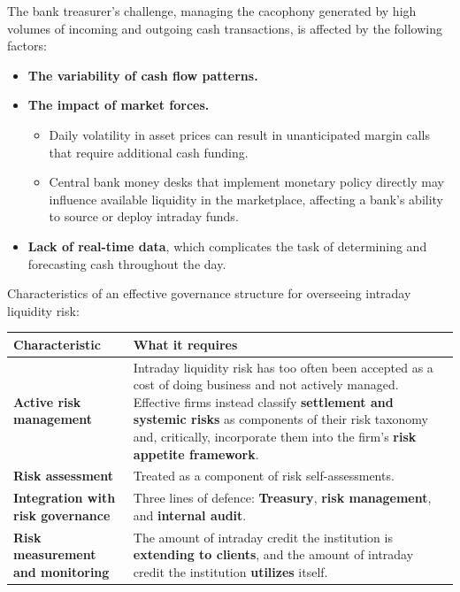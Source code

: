 The bank treasurer's challenge, managing the cacophony generated by high volumes of incoming and outgoing cash transactions, is affected by the following factors:

\begin{itemize}
\item \textbf{The variability of cash flow patterns.}
\item \textbf{The impact of market forces.}
  \begin{itemize}
  \item Daily volatility in asset prices can result in unanticipated margin calls that require additional cash funding.
  \item Central bank money desks that implement monetary policy directly may influence available liquidity in the marketplace, affecting a bank's ability to source or deploy intraday funds.
  \end{itemize}
\item \textbf{Lack of real-time data}, which complicates the task of determining and forecasting cash throughout the day.
\end{itemize}


Characteristics of an effective governance structure for overseeing intraday liquidity risk:

\begin{center}
\small
\begin{tabularx}{\textwidth}{@{}p{4.1cm} X@{}}
\toprule
\rowcolor{FRMSoft}\textbf{Characteristic} & \textbf{What it requires} \\
\midrule
\textbf{Active risk management} &
Intraday liquidity risk has too often been accepted as a cost of doing business and not actively managed. Effective firms instead classify \textbf{settlement and systemic risks} as components of their risk taxonomy and, critically, incorporate them into the firm's \textbf{risk appetite framework}. \\
\addlinespace
\textbf{Risk assessment} &
Treated as a component of risk self-assessments. \\
\addlinespace
\textbf{Integration with risk governance} &
Three lines of defence: \textbf{Treasury}, \textbf{risk management}, and \textbf{internal audit}. \\
\addlinespace
\textbf{Risk measurement and monitoring} &
The amount of intraday credit the institution is \textbf{extending to clients}, and the amount of intraday credit the institution \textbf{utilizes} itself. \\
\bottomrule
\end{tabularx}
\end{center}

